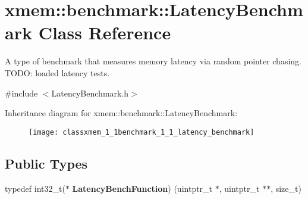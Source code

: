 \hypertarget{classxmem_1_1benchmark_1_1_latency_benchmark}{}\section{xmem\+:\+:benchmark\+:\+:Latency\+Benchmark Class Reference}
\label{classxmem_1_1benchmark_1_1_latency_benchmark}


A type of benchmark that measures memory latency via random pointer chasing. T\+O\+D\+O\+: loaded latency tests.  




{\ttfamily \#include $<$Latency\+Benchmark.\+h$>$}

Inheritance diagram for xmem\+:\+:benchmark\+:\+:Latency\+Benchmark\+:\begin{figure}[H]
\begin{center}
\leavevmode
\texttt{[image: classxmem\_1\_1benchmark\_1\_1\_latency\_benchmark]}
\end{center}
\end{figure}
\subsection*{Public Types}
\begin{DoxyCompactItemize}
\item 
\hypertarget{classxmem_1_1benchmark_1_1_latency_benchmark_aac378764f476152456a39c9eb1e06c29}{}typedef int32\+\_\+t($\ast$ {\bfseries Latency\+Bench\+Function}) (uintptr\+\_\+t $\ast$, uintptr\+\_\+t $\ast$$\ast$, size\+\_\+t)\label{classxmem_1_1benchmark_1_1_latency_benchmark_aac378764f476152456a39c9eb1e06c29}

\end{DoxyCompactItemize}

